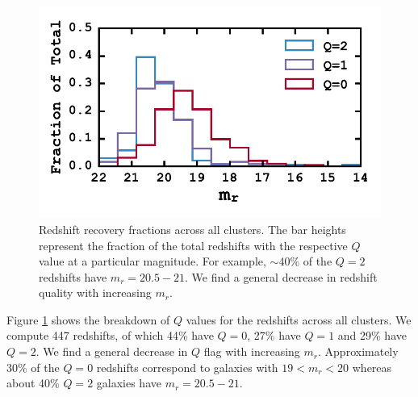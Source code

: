\begin{figure}
	\includegraphics[width=\textwidth]{figures/redshiftHist.pdf} 
	\caption{Redshift recovery fractions across all clusters. The bar heights represent the fraction of the total redshifts with the respective $Q$ value at a particular magnitude. For example, $\sim 40\%$ of the $Q=2$ redshifts have $m_r = 20.5-21$. We find a general decrease in redshift quality with increasing $m_r$. } \label{fig:redshiftHist} 
\end{figure}

Figure \ref{fig:redshiftHist} shows the breakdown of $Q$ values for the redshifts across all clusters. We compute 447 redshifts, of which 44\% have $Q=0$, 27\% have $Q=1$ and 29\% have $Q=2$. We find a general decrease in $Q$ flag with increasing $m_r$. Approximately 30\% of the $Q=0$ redshifts correspond to galaxies with $19 < m_r <20$ whereas about 40\% $Q=2$ galaxies have $m_r = 20.5-21$.

